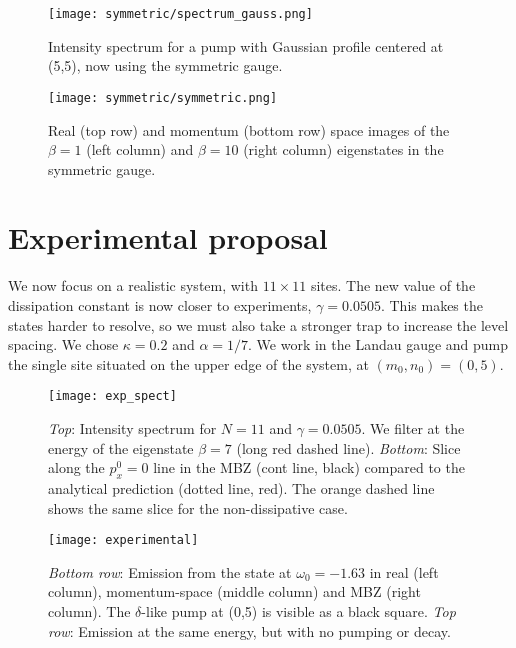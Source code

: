 \documentclass[twocolumn, 10pt, aps, superscriptaddress, floatfix, showpacs, prb, citeautoscript]{revtex4-1}
\begin{document}
\begin{figure}[htb]
  \centerline{\texttt{[image: symmetric/spectrum\_gauss.png]}}
  \caption{Intensity spectrum for a pump with Gaussian profile centered at (5,5), now using the symmetric gauge.}
  \label{fig:gauss_symm_spectrum}
\end{figure}


\begin{figure}[htb]
  \centerline{\texttt{[image: symmetric/symmetric.png]}}
  \caption{Real (top row) and momentum (bottom row) space images of the $\beta=1$ (left column) and $\beta=10$ (right column) eigenstates in the symmetric gauge.}
  \label{fig:gauss_symm_states}
\end{figure}


\section{Experimental proposal}
\label{sec:experiment}

We now focus on a realistic system, with $11 \times 11$ sites. The new
value of the dissipation constant is now closer to experiments,
$\gamma = 0.0505$. This makes the states harder to resolve, so we must
also take a stronger trap to increase the level spacing. We chose
$\kappa = 0.2$ and $\alpha = 1/7$. We work in the Landau gauge and
pump the single site situated on the upper edge of the system, at
$(m_0,n_0)= (0,5)$.

\begin{figure}[htb]
  \centerline{\texttt{[image: exp\_spect]}}
  \caption{\emph{Top}: Intensity spectrum for $N=11$ and $\gamma = 0.0505$. We filter at the energy of the eigenstate $\beta=7$ (long red dashed line).
\emph{Bottom}: Slice along the $p_x^0 = 0$ line in the MBZ (cont line, black) compared to the analytical prediction (dotted line, red). The orange dashed line shows the same slice for the non-dissipative case.}
  \label{fig:exp_spectrum}
\end{figure}


\begin{figure}[htb]
  \centerline{\texttt{[image: experimental]}}
  \caption{\emph{Bottom row}: Emission from the state at $\omega_0 =
-1.63$ in real (left column), momentum-space (middle column) and MBZ
(right column). The $\delta$-like pump at (0,5) is visible as a black
square.  \emph{Top row}: Emission at the same energy, but with no
pumping or decay.}
  \label{fig:exp_states}
\end{figure}
\end{document}
